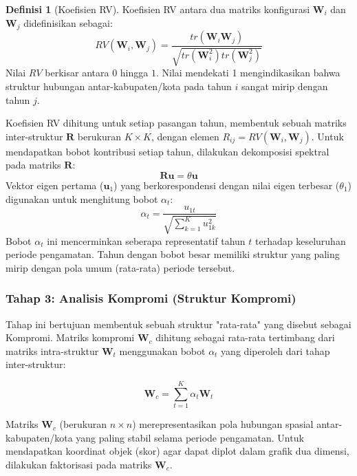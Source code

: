 \documentclass[a4paper]{article}
\theoremstyle{definition} %
\newtheorem{definition}{Definisi}[section]
\begin{document}
\begin{definition}[Koefisien RV]
	Koefisien RV antara dua matriks konfigurasi $\mathbf{W}_i$ dan $\mathbf{W}_j$ didefinisikan sebagai:
	\begin{equation}
		RV(\mathbf{W}_i, \mathbf{W}_j) = \frac{tr(\mathbf{W}_i \mathbf{W}_j)}{\sqrt{tr(\mathbf{W}_i^2) tr(\mathbf{W}_j^2)}}
	\end{equation}
	Nilai $RV$ berkisar antara $0$ hingga $1$. Nilai mendekati 1 mengindikasikan bahwa struktur hubungan antar-kabupaten/kota pada tahun $i$ sangat mirip dengan tahun $j$.
\end{definition}

Koefisien RV dihitung untuk setiap pasangan tahun, membentuk sebuah matriks inter-struktur $\mathbf{R}$ berukuran $K \times K$, dengan elemen $R_{ij} = RV(\mathbf{W}_i, \mathbf{W}_j)$. Untuk mendapatkan bobot kontribusi setiap tahun, dilakukan dekomposisi spektral pada matriks $\mathbf{R}$:
\begin{equation}
	\mathbf{R} \mathbf{u} = \theta \mathbf{u}
\end{equation}
Vektor eigen pertama ($\mathbf{u}_1$) yang berkorespondensi dengan nilai eigen terbesar ($\theta_1$) digunakan untuk menghitung bobot $\alpha_t$:
\begin{equation}
	\alpha_t = \frac{u_{1t}}{\sqrt{\sum_{k=1}^{K} u_{1k}^2}}
\end{equation}
Bobot $\alpha_t$ ini mencerminkan seberapa representatif tahun $t$ terhadap keseluruhan periode pengamatan. Tahun dengan bobot besar memiliki struktur yang paling mirip dengan pola umum (rata-rata) periode tersebut.

\subsubsection{Tahap 3: Analisis Kompromi (Struktur Kompromi)}

Tahap ini bertujuan membentuk sebuah struktur "rata-rata" yang disebut sebagai Kompromi. Matriks kompromi $\mathbf{W}_c$ dihitung sebagai rata-rata tertimbang dari matriks intra-struktur $\mathbf{W}_t$ menggunakan bobot $\alpha_t$ yang diperoleh dari tahap inter-struktur:

\begin{equation}
	\mathbf{W}_c = \sum_{t=1}^{K} \alpha_t \mathbf{W}_t
\end{equation}

Matriks $\mathbf{W}_c$ (berukuran $n \times n$) merepresentasikan pola hubungan spasial antar-kabupaten/kota yang paling stabil selama periode pengamatan. Untuk mendapatkan koordinat objek (skor) agar dapat diplot dalam grafik dua dimensi, dilakukan faktorisasi pada matriks $\mathbf{W}_c$.
\end{document}
